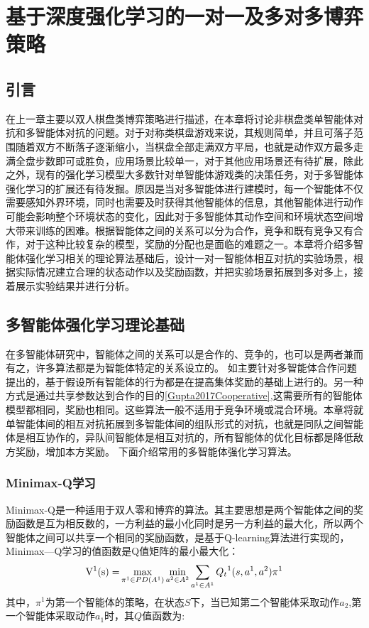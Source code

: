 \chapter{基于深度强化学习的一对一及多对多博弈策略}
\section{引言}
在上一章主要以双人棋盘类博弈策略进行描述，在本章将讨论非棋盘类单智能体对抗和多智能体对抗的问题。对于对称类棋盘游戏来说，其规则简单，并且可落子范围随着双方不断落子逐渐缩小，当棋盘全部走满双方平局，也就是动作双方最多走满全盘步数即可或胜负，应用场景比较单一，对于其他应用场景还有待扩展，除此之外，现有的强化学习模型大多数针对单智能体游戏类的决策任务，对于多智能体强化学习的扩展还有待发掘。原因是当对多智能体进行建模时，每一个智能体不仅需要感知外界环境，同时也需要及时获得其他智能体的信息，其他智能体进行动作可能会影响整个环境状态的变化，因此对于多智能体其动作空间和环境状态空间增大带来训练的困难。根据智能体之间的关系可以分为合作，竞争和既有竞争又有合作，对于这种比较复杂的模型，奖励的分配也是面临的难题之一。本章将介绍多智能体强化学习相关的理论算法基础后，设计一对一智能体相互对抗的实验场景，根据实际情况建立合理的状态动作以及奖励函数，并把实验场景拓展到多对多上，接着展示实验结果并进行分析。
\section{多智能体强化学习理论基础}
在多智能体研究中，智能体之间的关系可以是合作的、竞争的，也可以是两者兼而有之，许多算法都是为智能体特定的关系设立的。
如\cite{Lazaridou2017Multi}主要针对多智能体合作问题提出的，基于假设所有智能体的行为都是在提高集体奖励的基础上进行的。另一种方式是通过共享参数达到合作的目的\ref{Gupta2017Cooperative},这需要所有的智能体模型都相同，奖励也相同。这些算法一般不适用于竞争环境或混合环境。本章将就单智能体间的相互对抗拓展到多智能体间的组队形式的对抗，也就是同队之间智能体是相互协作的，异队间智能体是相互对抗的，所有智能体的优化目标都是降低敌方奖励，增加本方奖励。
下面介绍常用的多智能体强化学习算法。
\subsection{Minimax-Q学习}
Minimax-Q\cite{Littman1994Markov}是一种适用于双人零和博弈的算法。其主要思想是两个智能体之间的奖励函数是互为相反数的，一方利益的最小化同时是另一方利益的最大化，所以两个智能体之间可以共享一个相同的奖励函数，是基于Q-learning算法进行实现的，Minimax—Q学习的值函数是Q值矩阵的最小最大化：
\begin{equation}
{{\rm{V}}^1}{\rm{(s) = }}\mathop {\max }\limits_{{\pi ^1} \in PD({A^1})} \mathop {\min }\limits_{{a^2} \in {A^2}} \sum\limits_{{a^1} \in {A^1}} {{Q_t}^1(s,{a^1},{a^2})} {\pi ^1}
\end{equation}
其中，${\pi ^1}$为第一个智能体的策略，在状态$S$下，当已知第二个智能体采取动作$a_2$,第一个智能体采取动作$a_1$时，其$Q$值函数为:

